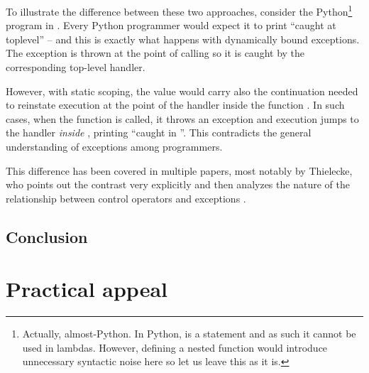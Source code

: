 To illustrate the difference between these two approaches, consider the
Python\footnote{Actually, almost-Python. In Python,
 is a statement and as such it cannot be used in lambdas. However, defining
a nested function would introduce unnecessary syntactic noise here so let us leave this as it is.}
program in . Every Python programmer would expect it to print
``caught at toplevel'' -- and this is exactly what happens with dynamically bound exceptions.
The exception is thrown at the point of calling  so it is caught by the corresponding
top-level handler.

However, with static scoping, the value  would carry also the continuation needed
to reinstate execution at the point of the handler inside the function . In such cases,
when the function  is called, it throws an exception and execution jumps to the handler
\emph{inside }, printing ``caught in ''. This contradicts the general
understanding of exceptions among programmers.

This difference has been covered in multiple papers, most notably by Thielecke, who
points out the contrast very explicitly \cite{thielecke:contrast} and then analyzes
the nature of the relationship between control operators and exceptions \cite{thielecke01}.



\subsection{Conclusion}


\section{Practical appeal}


